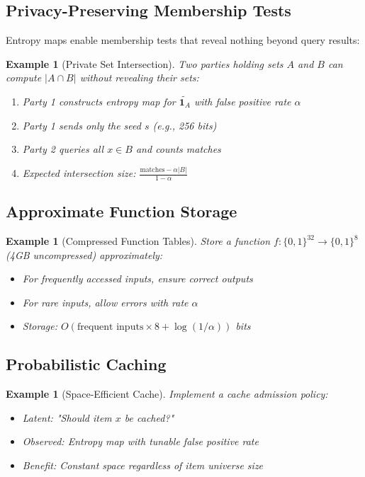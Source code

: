 \documentclass[11pt,final,hidelinks]{article}
\newtheorem{example}[theorem]{Example}
\newcommand{\obs}[1]{\widetilde{#1}}  %
\newcommand{\Indicator}[1]{\mathbf{1}_{#1}}
\newcommand{\Card}[1]{\lvert#1\rvert}
\newcommand{\fprate}{\alpha}
\begin{document}
\subsection{Privacy-Preserving Membership Tests}

Entropy maps enable membership tests that reveal nothing beyond query results:

\begin{example}[Private Set Intersection]
Two parties holding sets $A$ and $B$ can compute $\Card{A \cap B}$ without revealing their sets:
\begin{enumerate}
    \item Party 1 constructs entropy map for $\obs{\Indicator{A}}$ with false positive rate $\fprate$
    \item Party 1 sends only the seed $s$ (e.g., 256 bits)
    \item Party 2 queries all $x \in B$ and counts matches
    \item Expected intersection size: $\frac{\text{matches} - \fprate \Card{B}}{1 - \fprate}$
\end{enumerate}
\end{example}

\subsection{Approximate Function Storage}

\begin{example}[Compressed Function Tables]
Store a function $f: \{0,1\}^{32} \to \{0,1\}^8$ (4GB uncompressed) approximately:
\begin{itemize}
    \item For frequently accessed inputs, ensure correct outputs
    \item For rare inputs, allow errors with rate $\fprate$
    \item Storage: $O(\text{frequent inputs} \times 8 + \log(1/\fprate))$ bits
\end{itemize}
\end{example}

\subsection{Probabilistic Caching}

\begin{example}[Space-Efficient Cache]
Implement a cache admission policy:
\begin{itemize}
    \item Latent: "Should item $x$ be cached?"
    \item Observed: Entropy map with tunable false positive rate
    \item Benefit: Constant space regardless of item universe size
\end{itemize}
\end{example}
\end{document}
